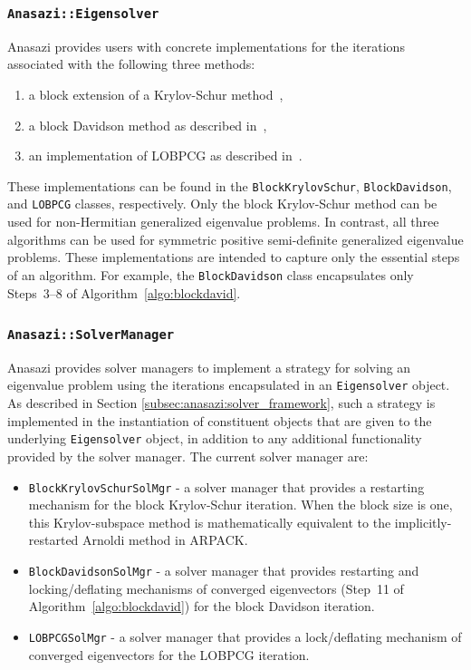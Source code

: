 \documentclass[acmtoms,acmnow]{acmtrans2m}
\newcommand{\aspace}[1]{\texttt{#1}}
\begin{document}
\subsubsection{\aspace{Anasazi::Eigensolver}}

Anasazi provides users with concrete implementations for the iterations associated with
the following three methods:
\begin{enumerate}
  \item a block extension of a Krylov-Schur method~\cite{stew:01},
  \item a block Davidson method as described in~\cite{Arbenz:2005:ACE},
  \item an implementation of LOBPCG as described in~\cite{Hetmaniuk:2006:BSL}.
\end{enumerate}
These implementations can be found in the \aspace{BlockKrylovSchur}, \aspace{BlockDavidson}, 
and \aspace{LOBPCG} classes, respectively. Only the block Krylov-Schur method can be used
for non-Hermitian generalized eigenvalue problems. In contrast, all three algorithms can 
be used for symmetric positive semi-definite generalized eigenvalue problems. These
implementations are intended to capture only the essential steps of an algorithm. For
example, the \aspace{BlockDavidson} class encapsulates only Steps~3--8 of
Algorithm~\ref{algo:blockdavid}.

\subsubsection{\aspace{Anasazi::SolverManager}}

Anasazi provides solver managers to implement a strategy for solving an eigenvalue problem
using the iterations encapsulated in an \aspace{Eigensolver} object. As described in Section  
\ref{subsec:anasazi:solver_framework}, such a strategy is
implemented in the instantiation of constituent objects that are given to the underlying
\aspace{Eigensolver} object, in addition to any additional functionality provided by the
solver manager. The current solver manager are:
\begin{itemize}
  \item \aspace{BlockKrylovSchurSolMgr} - a solver manager 
    that provides a restarting mechanism for the block Krylov-Schur iteration.
  When the block size is one, this Krylov-subspace method is mathematically equivalent to the
  implicitly-restarted Arnoldi method in ARPACK. 
  \item \aspace{BlockDavidsonSolMgr} - a solver manager that provides restarting and locking/deflating
    mechanisms of converged eigenvectors (Step~11 of Algorithm~\ref{algo:blockdavid})
    for the block Davidson iteration.
  \item \aspace{LOBPCGSolMgr} - a solver manager 
    that provides a lock/deflating mechanism of converged eigenvectors for the LOBPCG
    iteration.
\end{itemize}
\end{document}
